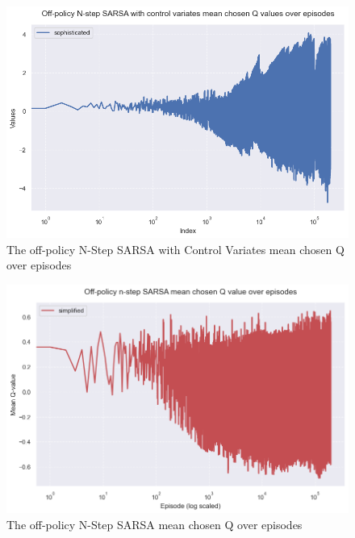 \documentclass{article}
\begin{document}
\begin{figure}[h!]
	\centering
	\includegraphics[scale=0.54]{./images/Figure 2.png}
	\caption{The off-policy N-Step SARSA with Control Variates mean chosen Q over
  episodes}
	\label{fig:Figure2}
\end{figure}

\begin{figure}[!ht]
	\centering
	\includegraphics[scale=0.55]{./images/Figure 3.png}
	\caption{The off-policy N-Step SARSA mean chosen Q over
  episodes}
	\label{fig:Figure3}
\end{figure}
\end{document}
